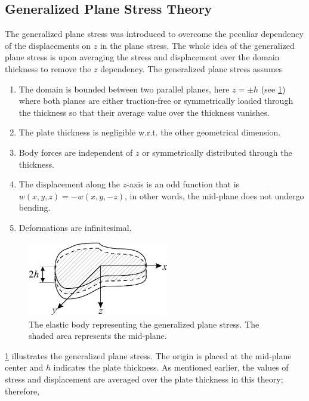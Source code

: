 \documentclass{article}
\begin{document}
\subsection{Generalized Plane Stress Theory}
The generalized plane stress was introduced to overcome the peculiar dependency of the displacements on $z$ in the plane stress. The whole idea of the generalized plane stress is upon averaging the stress and displacement over the domain thickness to remove the $z$ dependency. The generalized plane stress assumes

\begin{enumerate}
    \item The domain is bounded between two parallel planes, here $z=\pm h$ (see \cref{fig:gen_plane_stress}) where both planes are either traction-free or symmetrically loaded through the thickness so that their average value over the thickness vanishes.
    \item The plate thickness is negligible w.r.t. the other geometrical dimension.
    \item Body forces are independent of $z$ or symmetrically distributed through the thickness.
    \item The displacement along the $z$-axis is an odd function that is $w(x, y, z) = -w(x, y, -z)$, in other words, the mid-plane does not undergo bending.
    \item Deformations are infinitesimal.
\end{enumerate}

\begin{figure}[H]
    \centering
    \includegraphics[width = 0.55\textwidth ]{figures/gen_plane_stress.pdf}
    \caption{The elastic body representing the generalized plane stress. The shaded area represents the mid-plane.}
    \label{fig:gen_plane_stress}
\end{figure}

\cref{fig:gen_plane_stress} illustrates the generalized plane stress. The origin is placed at the mid-plane center and $h$ indicates the plate thickness. As mentioned earlier, the values of stress and displacement are averaged over the plate thickness in this theory; therefore,
\end{document}

